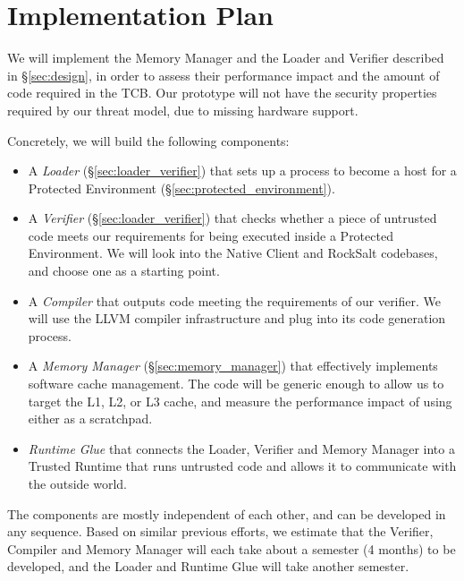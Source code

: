 \section{Implementation Plan}
\label{sec:implementation}

We will implement the Memory Manager and the Loader and Verifier described in
\S \ref{sec:design}, in order to assess their performance impact and the amount
of code required in the TCB. Our prototype will not have the security
properties required by our threat model, due to missing hardware support.

Concretely, we will build the following components:

\begin{itemize}

\item A \textit{Loader} (\S \ref{sec:loader_verifier}) that sets up a process
      to become a host for a Protected Environment
      (\S \ref{sec:protected_environment}).

\item A \textit{Verifier} (\S \ref{sec:loader_verifier}) that checks whether a
      piece of untrusted code meets our requirements for being executed inside
      a Protected Environment. We will look into the Native Client and RockSalt
      codebases, and choose one as a starting point.

\item A \textit{Compiler} that outputs code meeting the requirements of our
      verifier. We will use the LLVM \cite{lattner2004llvm} compiler
      infrastructure and plug into its code generation process.

\item A \textit{Memory Manager} (\S \ref{sec:memory_manager}) that effectively
      implements software cache management. The code will be generic enough to
      allow us to target the L1, L2, or L3 cache, and measure the performance
      impact of using either as a scratchpad.

\item \textit{Runtime Glue} that connects the Loader, Verifier and Memory
      Manager into a Trusted Runtime that runs untrusted code and allows it to
      communicate with the outside world.

\end{itemize}

The components are mostly independent of each other, and can be developed in
any sequence. Based on similar previous efforts, we estimate that the Verifier,
Compiler and Memory Manager will each take about a semester (4 months) to be
developed, and the Loader and Runtime Glue will take another semester.

